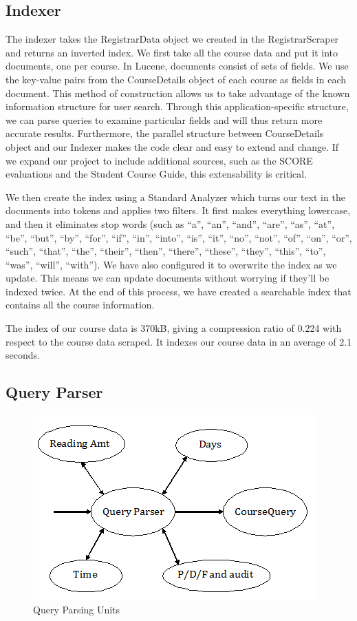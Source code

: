 \documentclass[12pt,letterpaper]{article}
\begin{document}
\subsection{Indexer}
	
The indexer takes the RegistrarData object we created in the RegistrarScraper and returns an inverted index. We first take all the course data and put it into documents, one per course. In Lucene, documents consist of sets of fields. We use the key-value pairs from the CourseDetails object of each course as fields in each document. This method of construction allows us to take advantage of the known information structure for user search. Through this application-specific structure, we can parse queries to examine particular fields and will thus return more accurate results. Furthermore, the parallel structure between CourseDetails object and our Indexer makes the code clear and easy to extend and change. If we expand our project to include additional sources, such as the SCORE evaluations and the Student Course Guide, this extensability is critical. 

We then create the index using a Standard Analyzer which turns our text in the documents into tokens and applies two filters. It first makes everything lowercase, and then it eliminates stop words (such as ``a'', ``an'',  ``and'', ``are'', ``as'', ``at'', ``be'', ``but'', ``by'', ``for'', ``if'', ``in'', ``into'', ``is'', ``it'', ``no'', ``not'', ``of'', ``on'', ``or'', ``such'', ``that'', ``the'', ``their'', ``then'', ``there'', ``these'', ``they'', ``this'', ``to'', ``was'', ``will'', ``with''). We have also configured it to overwrite the index as we update. This means we can update documents without worrying if they'll be indexed twice. At the end of this process, we have created a searchable index that contains all the course information. 

The index of our course data is 370kB, giving a compression ratio of 0.224 with respect to the course data scraped. It indexes our course data in an average of 2.1 seconds. 
	
\subsection{Query Parser}

\begin{figure}
\begin{center}
\includegraphics{QueryParserDiagram.png}
\end{center}
\caption{Query Parsing Units}
\end{figure}
	
\end{document}
